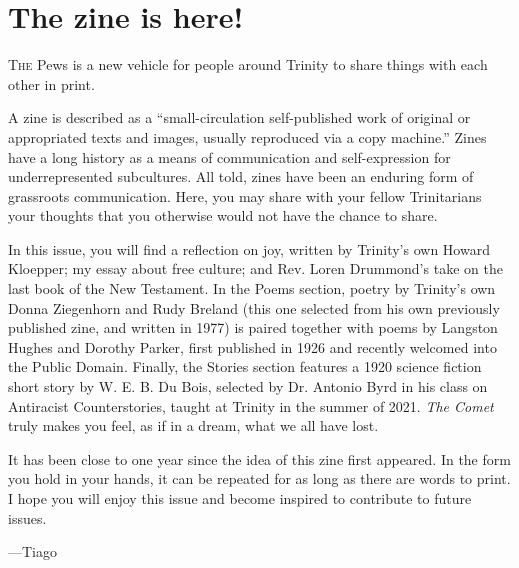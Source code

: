 \chapter{The zine is here!}

\lettrine[lines=2]{T}{he} Pews is a new vehicle for people
around Trinity to share things with each other in print.

A zine is described as a ``small-circulation self-published
work of original or appropriated texts and images, usually
reproduced via a copy machine.'' Zines have a long history as
a means of communication and self-expression for
underrepresented subcultures. All told, zines have been an
enduring form of grassroots communication. Here, you may share
with your fellow Trinitarians your thoughts that you otherwise
would not have the chance to share.

In this issue, you will find a reflection on joy, written by
Trinity's own Howard Kloepper; my essay about free culture;
and Rev. Loren Drummond's take on the last book of the New
Testament. In the Poems section, poetry by Trinity's own Donna
Ziegenhorn and Rudy Breland (this one selected from his own
previously published zine, and written in 1977) is paired
together with poems by Langston Hughes and Dorothy Parker,
first published in 1926 and recently welcomed into the Public
Domain. Finally, the Stories section features a 1920 science
fiction short story by W. E. B. Du Bois, selected by
Dr. Antonio Byrd in his class on Antiracist Counterstories,
taught at Trinity in the summer of 2021. \emph{The Comet}
truly makes you feel, as if in a dream, what we all have lost.

It has been close to one year since the idea of this zine first
appeared. In the form you hold in your hands, it can be repeated
for as long as there are words to print. I hope you will enjoy
this issue and become inspired to contribute to future issues.

\hspace{20em}---Tiago
